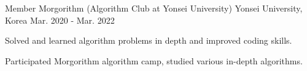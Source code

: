 \begin{cventries}

\cventry
{Member} %
{Morgorithm (Algorithm Club at Yonsei University)} %
{Yonsei University, Korea} %
{Mar. 2020 - Mar. 2022} %
{ %
\begin{cvitems}
\item {Solved and learned algorithm problems in depth and improved coding skills.}
\item {Participated Morgorithm algorithm camp, studied various in-depth algorithms.}
\end{cvitems}
}


\end{cventries}
